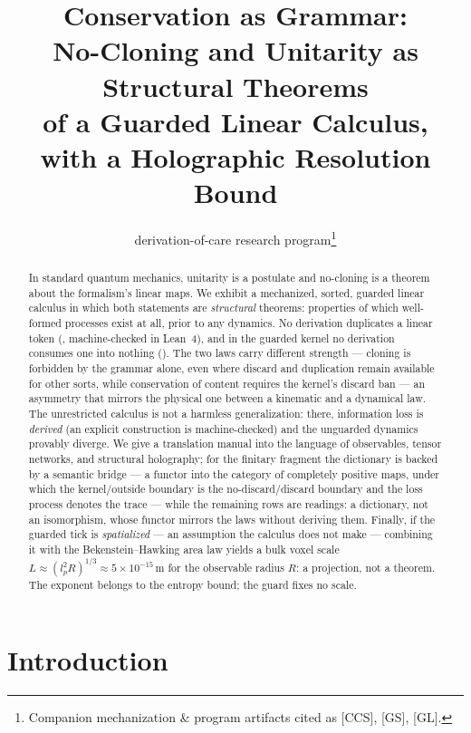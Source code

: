 \documentclass[11pt]{article}
\title{Conservation as Grammar:\\ No-Cloning and Unitarity as Structural Theorems\\ of a Guarded Linear Calculus,\\ with a Holographic Resolution Bound}
\author{derivation-of-care research program\thanks{Companion mechanization \& program artifacts cited as [CCS], [GS], [GL].}}
\date{}
\begin{document}
\maketitle

\begin{abstract}
In standard quantum mechanics, unitarity is a postulate and no-cloning is a
theorem about the formalism's linear maps. We exhibit a mechanized, sorted,
guarded linear calculus in which both statements are \emph{structural}
theorems: properties of which well-formed processes exist at all, prior to any
dynamics. No derivation duplicates a linear token
(, machine-checked in Lean~4), and in the guarded
kernel no derivation consumes one into nothing
(). The two laws carry different strength ---
cloning is forbidden by the grammar alone, even where discard and duplication
remain available for other sorts, while conservation of content requires the
kernel's discard ban --- an asymmetry that mirrors the physical one between a
kinematic and a dynamical law. The unrestricted calculus is not a harmless
generalization: there, information loss is \emph{derived} (an explicit
construction is machine-checked) and the unguarded dynamics provably diverge.
We give a translation manual into the language of observables, tensor
networks, and structural holography; for the finitary fragment the
dictionary is backed by a semantic bridge --- a functor into the category
of completely positive maps, under which the kernel/outside boundary is the
no-discard/discard boundary and the loss process denotes the trace --- while
the remaining rows are readings: a dictionary, not an isomorphism, whose
functor mirrors the laws without deriving them.
Finally, if the guarded tick is \emph{spatialized} --- an assumption the
calculus does not make --- combining it with the Bekenstein--Hawking area law
yields a bulk voxel scale $L \approx (l_p^2 R)^{1/3} \approx 5\times
10^{-15}\,\mathrm{m}$ for the observable radius $R$: a projection, not a
theorem. The exponent belongs to the entropy bound; the guard fixes no scale.
\end{abstract}

\section{Introduction}
\end{document}

